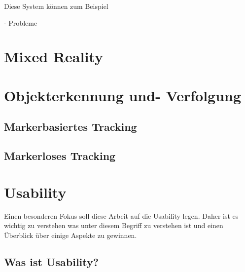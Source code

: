 Diese System können zum Beispiel    


-  Probleme

\section{Mixed Reality}



\section{Objekterkennung und- Verfolgung}



\subsection{Markerbasiertes Tracking}



\subsection{Markerloses Tracking}



\section{Usability}

Einen besonderen Fokus soll diese Arbeit auf die Usability legen. Daher ist es wichtig zu verstehen was unter diesem Begriff zu verstehen ist und einen Überblick über einige Aspekte zu gewinnen. 

\subsection{Was ist Usability?}

